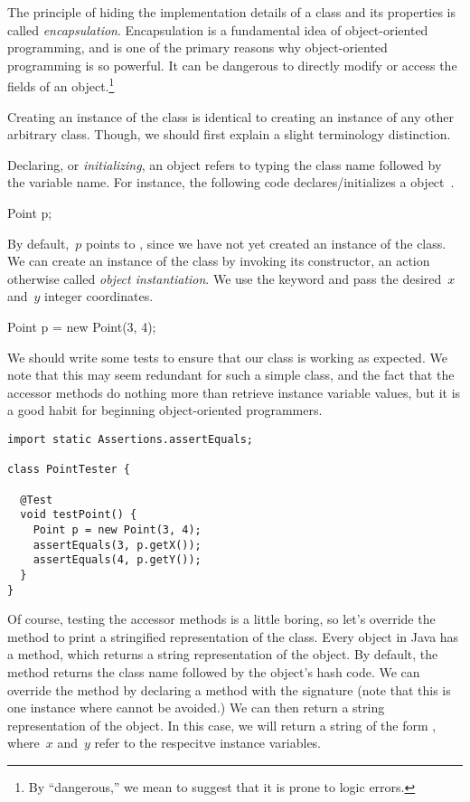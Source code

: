 The principle of hiding the implementation details of a class and its properties is called \emph{encapsulation}. 
Encapsulation is a fundamental idea of object-oriented programming, and is one of the primary reasons why object-oriented programming is so powerful. 
It can be dangerous to directly modify or access the fields of an object.\footnote{By ``dangerous,'' we mean to suggest that it is prone to logic errors.} 

Creating an instance of the  class is identical to creating an instance of any other arbitrary class.
Though, we should first explain a slight terminology distinction.

Declaring, or \emph{initializing}, an object refers to typing the class name followed by the variable name. 
For instance, the following code declares/initializes a  object~.

\begin{verbnobox}[\small]
Point p;
\end{verbnobox}

By default,~$p$ points to , since we have not yet created an instance of the  class. 
We can create an instance of the  class by invoking its constructor, an action otherwise called \emph{object instantiation}. 
We use the  keyword and pass the desired~$x$ and~$y$ integer coordinates. 

\begin{verbnobox}[\small]
Point p = new Point(3, 4);
\end{verbnobox}

We should write some tests to ensure that our  class is working as expected. 
We note that this may seem redundant for such a simple class, and the fact that the accessor methods do nothing more than retrieve instance variable values, but it is a good habit for beginning object-oriented programmers.

\begin{lstlisting}[language=MyJava]
import static Assertions.assertEquals;

class PointTester {
  
  @Test
  void testPoint() {
    Point p = new Point(3, 4);
    assertEquals(3, p.getX());
    assertEquals(4, p.getY());
  }
}
\end{lstlisting}

Of course, testing the accessor methods is a little boring, so let's override the  method to print a stringified representation of the  class. 
Every object in Java has a  method, which returns a string representation of the object. 
By default, the  method returns the class name followed by the object's hash code. 
We can override the  method by declaring a method with the signature  (note that this is one instance where  cannot be avoided.) 
We can then return a string representation of the object. 
In this case, we will return a string of the form , where~$x$ and~$y$ refer to the respecitve instance variables. 

